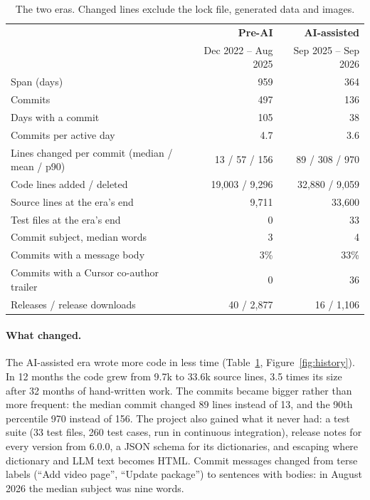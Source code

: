 ﻿\documentclass[11pt,a4paper]{article}
\begin{document}
\begin{table}[t]
\centering
\small
\caption{The two eras. Changed lines exclude the lock file, generated data and images.}
\label{tab:eras}
\begin{tabular}{@{}lrr@{}}
\toprule
 & \textcolor{preai}{\textbf{Pre-AI}} & \textcolor{withai}{\textbf{AI-assisted}} \\
 & Dec 2022 -- Aug 2025 & Sep 2025 -- Sep 2026 \\
\midrule
Span (days) & 959 & 364 \\
Commits & 497 & 136 \\
Days with a commit & 105 & 38 \\
Commits per active day & 4.7 & 3.6 \\
Lines changed per commit (median / mean / p90) & 13 / 57 / 156 & 89 / 308 / 970 \\
Code lines added / deleted & 19,003 / 9,296 & 32,880 / 9,059 \\
Source lines at the era's end & 9,711 & 33,600 \\
Test files at the era's end & 0 & 33 \\
Commit subject, median words & 3 & 4 \\
Commits with a message body & 3\% & 33\% \\
Commits with a Cursor co-author trailer & 0 & 36 \\
Releases / release downloads & 40 / 2,877 & 16 / 1,106 \\
\bottomrule
\end{tabular}
\end{table}

\paragraph{What changed.}
The AI-assisted era wrote more code in less time (Table~\ref{tab:eras}, Figure~\ref{fig:history}). In 12 months the code grew from 9.7k to 33.6k source lines, 3.5 times its size after 32 months of hand-written work. The commits became bigger rather than more frequent: the median commit changed 89 lines instead of 13, and the 90th percentile 970 instead of 156. The project also gained what it never had: a test suite (33 test files, 260 test cases, run in continuous integration), release notes for every version from 6.0.0, a JSON schema for its dictionaries, and escaping where dictionary and LLM text becomes HTML. Commit messages changed from terse labels (``Add video page'', ``Update package'') to sentences with bodies: in August 2026 the median subject was nine words.
\end{document}

